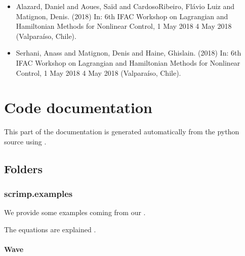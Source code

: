 \documentclass[letterpaper,10pt,english]{sphinxmanual}
\begin{document}
\begin{itemize}
\item {} 
\sphinxAtStartPar
Alazard, Daniel and Aoues, Saïd and Cardoso\sphinxhyphen{}Ribeiro, Flávio Luiz and Matignon, Denis.  (2018) In: 6th IFAC Workshop on Lagrangian and Hamiltonian Methods for Nonlinear Control, 1 May 2018 \sphinxhyphen{} 4 May 2018 (Valparaíso, Chile).

\item {} 
\sphinxAtStartPar
Serhani, Anass and Matignon, Denis and Haine, Ghislain.  (2018) In: 6th IFAC Workshop on Lagrangian and Hamiltonian Methods for Nonlinear Control, 1 May 2018 \sphinxhyphen{} 4 May 2018 (Valparaíso, Chile).

\end{itemize}

\sphinxstepscope


\section{Code documentation}
\label{\detokenize{scrimp:code-documentation}}\label{\detokenize{scrimp::doc}}
\sphinxAtStartPar
This part of the documentation is generated automatically from the python source using .


\subsection{Folders}
\label{\detokenize{scrimp:folders}}
\sphinxstepscope


\subsubsection{scrimp.examples}
\label{\detokenize{scrimp.examples:scrimp-examples}}\label{\detokenize{scrimp.examples::doc}}
\sphinxAtStartPar
We provide some examples coming from our .

\sphinxAtStartPar
The equations are explained .


\paragraph{Wave}
\label{\detokenize{scrimp.examples:wave}}
\end{document}
